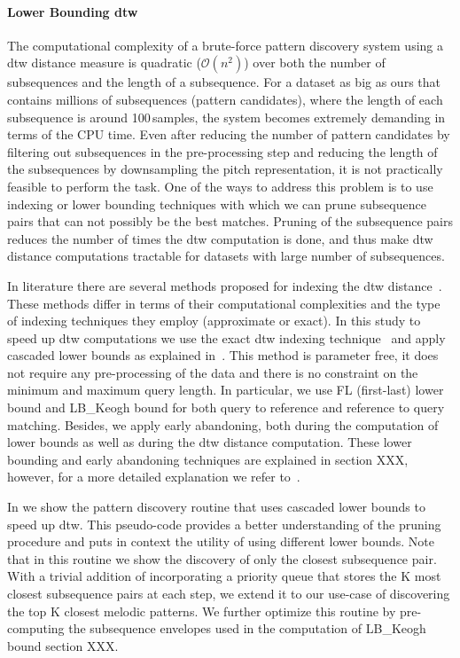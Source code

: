 \paragraph{Lower Bounding \gls{dtw}}
\label{LowerBoundingDTW}

The computational complexity of a brute-force pattern discovery system using a \gls{dtw} distance measure is quadratic ($\mathcal{O}(n^2)$) over both the number of subsequences and the length of a subsequence. For a dataset as big as ours that contains millions of subsequences (pattern candidates), where the length of each subsequence is around 100\,samples, the system becomes extremely demanding in terms of the CPU time. Even after reducing the number of pattern candidates by filtering out subsequences in the pre-processing step and reducing the length of the subsequences by downsampling the pitch representation, it is not practically feasible to perform the task. One of the ways to address this problem is to use indexing or lower bounding techniques with which we can prune subsequence pairs that can not possibly be the best matches. Pruning of the subsequence pairs reduces the number of times the \gls{dtw} computation is done, and thus make \gls{dtw} distance computations tractable for datasets with large number of subsequences.

In literature there are several methods proposed for indexing the \gls{dtw} distance~\citep{Keogh2004,vlachos2003indexing}. These methods differ in terms of their computational complexities and the type of indexing techniques they employ (approximate or exact). In this study to speed up \gls{dtw} computations we use the exact \gls{dtw} indexing technique~\citep{Keogh2004} and apply cascaded lower bounds as explained in~\cite{Rakthanmanon2013}. This method is parameter free, it does not require any pre-processing of the data and there is no constraint on the minimum and maximum query length. In particular, we use FL (first-last) lower bound and LB\_Keogh bound for both query to reference and reference to query matching. Besides, we apply early abandoning, both during the computation of lower bounds as well as during the \gls{dtw} distance computation. These lower bounding and early abandoning techniques are explained in section XXX, however, for a more detailed explanation we refer to~\cite{Rakthanmanon2013}. 

In  we show the pattern discovery routine that uses cascaded lower bounds to speed up \gls{dtw}. This pseudo-code provides a better understanding of the pruning procedure and puts in context the utility of using different lower bounds. Note that in this routine we show the discovery of only the closest subsequence pair. With a trivial addition of incorporating a priority queue that stores the K most closest subsequence pairs at each step, we extend it to our use-case of discovering the top K closest melodic patterns. We further optimize this routine by pre-computing the subsequence envelopes used in the computation of LB\_Keogh bound section XXX.

